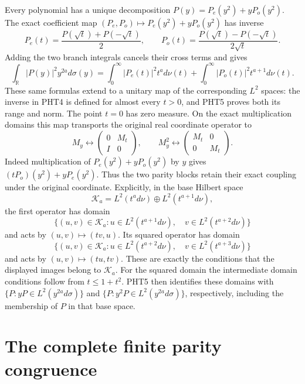 Every polynomial has a unique decomposition
$P(y)=P_e(y^2)+yP_o(y^2)$. The exact coefficient map
$(P_e,P_o)\mapsto P_e(y^2)+yP_o(y^2)$ has inverse
\[
 P_e(t)=\frac{P(\sqrt t)+P(-\sqrt t)}2,
 \qquad
 P_o(t)=\frac{P(\sqrt t)-P(-\sqrt t)}{2\sqrt t}.
\tag{PHT4}
\]
Adding the two branch integrals cancels their cross terms and gives
\[
 \int_{\mathbb R}|P(y)|^2y^{2a}d\sigma(y)
 =\int_0^\infty|P_e(t)|^2t^a d\nu(t)
  +\int_0^\infty|P_o(t)|^2t^{a+1}d\nu(t).
\tag{PHT5}
\]
These same formulas extend to a unitary map of the corresponding
$L^2$ spaces: the inverse in PHT4 is defined for almost every
$t>0$, and PHT5 proves both its range and norm. The point $t=0$
has zero measure. On the exact multiplication domains this map
transports the original real coordinate operator to
\[
 M_y\longleftrightarrow
 \begin{pmatrix}0&M_t\\I&0\end{pmatrix},
 \qquad
 M_y^2\longleftrightarrow
 \begin{pmatrix}M_t&0\\0&M_t\end{pmatrix}.
\tag{PHT6}
\]
Indeed multiplication of $P_e(y^2)+yP_o(y^2)$ by $y$ gives
$(tP_o)(y^2)+yP_e(y^2)$. Thus the two parity blocks retain
their exact coupling under the original coordinate.
Explicitly, in the base Hilbert space
\[
 \mathcal K_a=L^2(t^a d\nu)\oplus L^2(t^{a+1}d\nu),
\]
the first operator has domain
\[
 \{(u,v)\in\mathcal K_a:
       u\in L^2(t^{a+1}d\nu),\quad
       v\in L^2(t^{a+2}d\nu)\}
\]
and acts by $(u,v)\mapsto(tv,u)$. Its squared operator has
domain
\[
 \{(u,v)\in\mathcal K_a:
       u\in L^2(t^{a+2}d\nu),\quad
       v\in L^2(t^{a+3}d\nu)\}
\]
and acts by $(u,v)\mapsto(tu,tv)$. These are exactly the
conditions that the displayed images belong to $\mathcal K_a$.
For the squared domain the intermediate domain conditions
follow from $t\leq1+t^2$. PHT5 then identifies these domains
with $\{P:yP\in L^2(y^{2a}d\sigma)\}$ and
$\{P:y^2P\in L^2(y^{2a}d\sigma)\}$, respectively, including
the membership of $P$ in that base space.

\section{The complete finite parity congruence}

